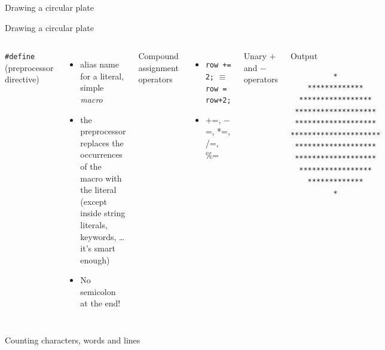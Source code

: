 \documentclass[usenames,dvipsnames,aspectratio=169]{beamer}
\newcommand{\kiemel}[1]{{\color{kiemelesszin}#1}}
\begin{document}
\begin{frame}{Drawing a circular plate}
    \begin{exampleblock}{}
    \scriptsize
    
  \end{exampleblock}
\end{frame}

\begin{frame}[fragile]{Drawing a circular plate}
  \begin{columns}[c]
      \texttt{\#define} (preprocessor directive)
      \begin{itemize}
        \small
        \item alias name for a literal, simple \emph{macro}
        \item the preprocessor replaces the occurrences of the macro with the literal (except inside string literals, keywords, \dots it's smart enough)
        \item \kiemel{No semicolon at the end!}
      \end{itemize}
      Compound assignment operators
      \begin{itemize}
        \small
        \item \texttt{row += 2;} \kiemel{$\equiv$} \texttt{row = row+2;}
        \item $+$=, $-$=, *=, /=, \%=
      \end{itemize}
      Unary $+$ and $-$ operators
      \scriptsize
      \begin{block}{Output}
        \begin{verbatim}
          *          
    *************    
  *****************  
 ******************* 
 ******************* 
*********************
 ******************* 
 ******************* 
  *****************  
    *************    
          *
    \end{verbatim}
      \end{block}
  \end{columns} 
\end{frame}

\begin{frame}{Counting characters, words and lines}
    \begin{exampleblock}{}
    \fontsize{7}{8} \selectfont
    \vspace{-.3cm}
    
    \vspace{-.3cm}
  \end{exampleblock}
\end{frame}
\end{document}
